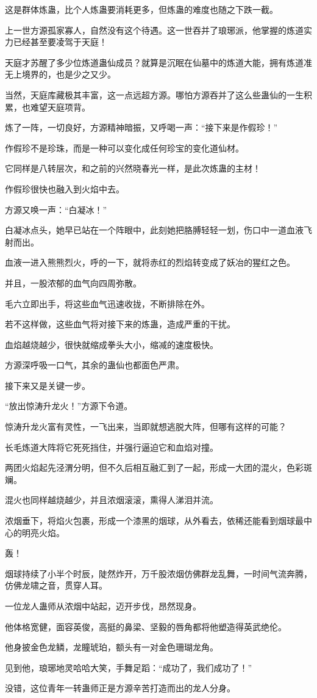 \begin{this_body}
这是群体炼蛊，比个人炼蛊要消耗更多，但炼蛊的难度也随之下跌一截。

上一世方源孤家寡人，自然没有这个待遇。这一世吞并了琅琊派，他掌握的炼道实力已经甚至要凌驾于天庭！

天庭才苏醒了多少位炼道蛊仙成员？就算是沉眠在仙墓中的炼道大能，拥有炼道准无上境界的，也是少之又少。

当然，天庭库藏极其丰富，这一点远超方源。哪怕方源吞并了这么些蛊仙的一生积累，也难望天庭项背。

炼了一阵，一切良好，方源精神暗振，又呼喝一声：“接下来是作假珍！”

作假珍不是珍珠，而是一种可以变化成任何珍宝的变化道仙材。

它同样是八转层次，和之前的兴然晓春光一样，是此次炼蛊的主材！

作假珍很快也融入到火焰中去。

方源又唤一声：“白凝冰！”

白凝冰点头，她早已站在一个阵眼中，此刻她把胳膊轻轻一划，伤口中一道血液飞射而出。

血液一进入熊熊烈火，呼的一下，就将赤红的烈焰转变成了妖冶的猩红之色。

并且，一股浓郁的血气向四周弥散。

毛六立即出手，将这些血气迅速收拢，不断排除在外。

若不这样做，这些血气将对接下来的炼蛊，造成严重的干扰。

血焰越烧越少，很快就缩成拳头大小，缩减的速度极快。

方源深呼吸一口气，其余的蛊仙也都面色严肃。

接下来又是关键一步。

“放出惊涛升龙火！”方源下令道。

惊涛升龙火富有灵性，一飞出来，当即就想逃脱大阵，但哪有这样的可能？

长毛炼道大阵将它死死挡住，并强行逼迫它和血焰对撞。

两团火焰起先泾渭分明，但不久后相互融汇到了一起，形成一大团的混火，色彩斑斓。

混火也同样越烧越少，并且浓烟滚滚，熏得人涕泪并流。

浓烟垂下，将焰火包裹，形成一个漆黑的烟球，从外看去，依稀还能看到烟球最中心的明亮火焰。

轰！

烟球持续了小半个时辰，陡然炸开，万千股浓烟仿佛群龙乱舞，一时间气流奔腾，仿佛龙啸之音，贯穿人耳。

一位龙人蛊师从浓烟中站起，迈开步伐，昂然现身。

他体格宽健，面容英俊，高挺的鼻梁、坚毅的唇角都将他塑造得英武绝伦。

他身披金色龙鳞，龙瞳琥珀，额头有一对金色珊瑚龙角。

见到他，琅琊地灵哈哈大笑，手舞足蹈：“成功了，我们成功了！”

没错，这位青年一转蛊师正是方源辛苦打造而出的龙人分身。

\end{this_body}

